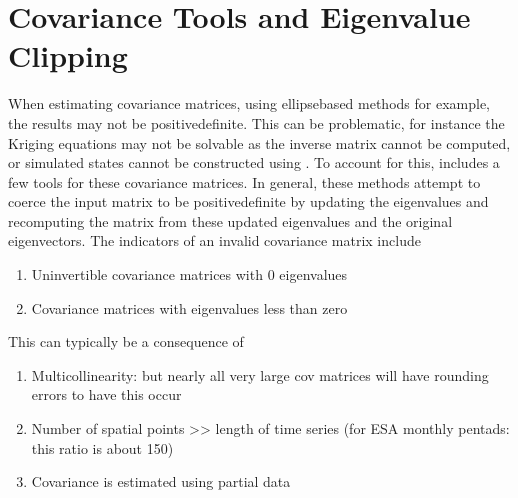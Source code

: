 \documentclass[letterpaper,10pt,english]{sphinxmanual}
\begin{document}
\section{Covariance Tools and Eigenvalue Clipping}
\label{\detokenize{misc:module-glomar_gridding.covariance_tools}}\label{\detokenize{misc:covariance-tools-and-eigenvalue-clipping}}
\sphinxAtStartPar
When estimating covariance matrices, using ellipse\sphinxhyphen{}based methods for example,
the results may not be positive\sphinxhyphen{}definite. This can be problematic, for instance
the Kriging equations may not be solvable as the inverse matrix cannot be
computed, or simulated states cannot be constructed using
. To account for this,
 includes a few tools for  these covariance matrices.
In general, these methods attempt to coerce the input matrix to be
positive\sphinxhyphen{}definite by updating the eigenvalues and re\sphinxhyphen{}computing the matrix from
these updated eigenvalues and the original eigenvectors. The indicators of an
invalid covariance matrix include
\begin{enumerate}
%
\item {}
\sphinxAtStartPar
Un\sphinxhyphen{}invertible covariance matrices with 0 eigenvalues

\item {}
\sphinxAtStartPar
Covariance matrices with eigenvalues less than zero

\end{enumerate}

\sphinxAtStartPar
This can typically be a consequence of
\begin{enumerate}
%
\item {}
\sphinxAtStartPar
Multicollinearity:
but nearly all very large cov matrices will have rounding errors to have
this occur

\item {}
\sphinxAtStartPar
Number of spatial points \textgreater{}\textgreater{} length of time series
(for ESA monthly pentads: this ratio is about 150)

\item {}
\sphinxAtStartPar
Covariance is estimated using partial data

\end{enumerate}
\end{document}

